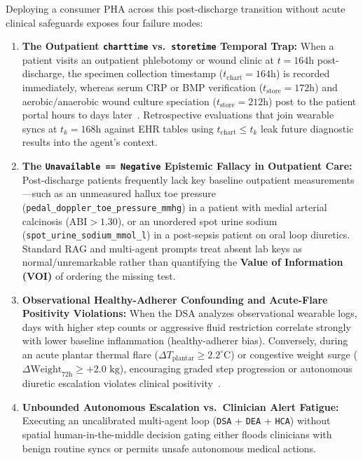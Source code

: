 \documentclass[10pt,twocolumn,letterpaper]{article}
\begin{document}
Deploying a consumer PHA across this post-discharge transition without acute clinical safeguards exposes four failure modes:
\begin{enumerate}
    \item \textbf{The Outpatient \texttt{charttime} vs.\ \texttt{storetime} Temporal Trap:} When a patient visits an outpatient phlebotomy or wound clinic at $t = 164\text{h}$ post-discharge, the specimen collection timestamp ($t_{\text{chart}} = 164\text{h}$) is recorded immediately, whereas serum CRP or BMP verification ($t_{\text{store}} = 172\text{h}$) and aerobic/anaerobic wound culture speciation ($t_{\text{store}} = 212\text{h}$) post to the patient portal hours to days later~\cite{johnson2023mimic,satz2026spatial}. Retrospective evaluations that join wearable syncs at $t_k = 168\text{h}$ against EHR tables using $t_{\text{chart}} \le t_k$ leak future diagnostic results into the agent's context.
    \item \textbf{The \texttt{Unavailable == Negative} Epistemic Fallacy in Outpatient Care:} Post-discharge patients frequently lack key baseline outpatient measurements---such as an unmeasured hallux toe pressure (\texttt{pedal\_doppler\_toe\_pressure\_mmhg}) in a patient with medial arterial calcinosis ($\text{ABI} > 1.30$), or an unordered spot urine sodium (\texttt{spot\_urine\_sodium\_mmol\_l}) in a post-sepsis patient on oral loop diuretics. Standard RAG and multi-agent prompts treat absent lab keys as normal/unremarkable rather than quantifying the \textbf{Value of Information (VOI)} of ordering the missing test.
    \item \textbf{Observational Healthy-Adherer Confounding and Acute-Flare Positivity Violations:} When the DSA analyzes observational wearable logs, days with higher step counts or aggressive fluid restriction correlate strongly with lower baseline inflammation (healthy-adherer bias). Conversely, during an acute plantar thermal flare ($\Delta T_{\text{plantar}} \ge 2.2^\circ\text{C}$) or congestive weight surge ($\Delta\text{Weight}_{72\text{h}} \ge +2.0\text{ kg}$), encouraging graded step progression or autonomous diuretic escalation violates clinical positivity~\cite{hernan2016using,bus2024guidelines}.
    \item \textbf{Unbounded Autonomous Escalation vs.\ Clinician Alert Fatigue:} Executing an uncalibrated multi-agent loop (\texttt{DSA} + \texttt{DEA} + \texttt{HCA}) without spatial human-in-the-middle decision gating either floods clinicians with benign routine syncs or permits unsafe autonomous medical actions.
\end{enumerate}
\end{document}

